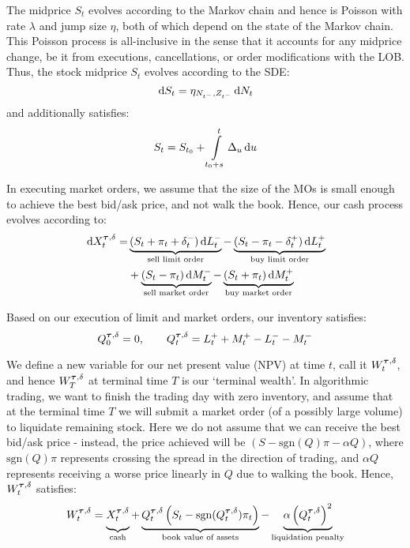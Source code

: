 The midprice $S_t$ evolves according to the Markov chain and hence is Poisson with rate $\lambda$ and jump size $\eta$, both of which depend on the state of the Markov chain. This Poisson process is all-inclusive in the sense that it accounts for any midprice change, be it from executions, cancellations, or order modifications with the LOB. Thus, the stock midprice $S_t$ evolves according to the SDE:
\begin{equation}\label{eq:stockprocess}
\,\mathrm{d} S_t = \eta_{N_{t^-},Z_{t^-}} \,\mathrm{d} N_t
\end{equation}
and additionally satisfies:
\begin{equation}\label{eq:stockintegral} 
S_t = S_{t_0} + \int\limits_{t_0 + s}^t \Delta_u \,\mathrm{d}u
\end{equation}

In executing market orders, we assume that the size of the MOs is small enough to achieve the best bid/ask price, and not walk the book. Hence, our cash process evolves according to:
\begin{equation}\label{eq:cashprocess}
\begin{split}
\,\mathrm{d} X^{\bm{\tau}, \delta}_t = 	&\underbrace{(S_t + \pi_t + \delta^{-}_t) \,\mathrm{d} L^{-}_t}_{\text{sell limit order}} - \underbrace{(S_t - \pi_t - \delta^{+}_t) \,\mathrm{d} L^{+}_t}_{\text{buy limit order}} \\
						&+ \underbrace{(S_t - \pi_t) \,\mathrm{d} M^{-}_t}_{\text{sell market order}} - \underbrace{(S_t + \pi_t) \,\mathrm{d} M^{+}_t}_{\text{buy market order}}
\end{split}
\end{equation}

Based on our execution of limit and market orders, our inventory satisfies:
\begin{equation}\label{eq:inventory}
Q^{\bm{\tau}, \delta}_0 = 0, \qquad Q^{\bm{\tau}, \delta}_t = L^+_t + M^+_t - L^-_t - M^-_t
\end{equation}

We define a new variable for our net present value (NPV) at time $t$, call it $W^{\bm{\tau}, \delta}_t$, and hence $W^{\bm{\tau}, \delta}_T$ at terminal time $T$ is our `terminal wealth'. In algorithmic trading, we want to finish the trading day with zero inventory, and assume that at the terminal time $T$ we will submit a market order (of a possibly large volume) to liquidate remaining stock. Here we do not assume that we can receive the best bid/ask price - instead, the price achieved will be $(S - \mathrm{sgn}(Q)\pi - \alpha Q)$, where $\mathrm{sgn}(Q)\pi$ represents crossing the spread in the direction of trading, and $\alpha Q$ represents receiving a worse price linearly in $Q$ due to walking the book. Hence, $W^{\bm{\tau}, \delta}_t$ satisfies:
\begin{equation}
\label{eq:terminalwealth}
W^{\btau, \delta}_t = \underbrace{\vphantom{\left( Q^{\btau, \delta}_t) \right)}X^{\btau, \delta}_t}_{\text{cash}}+ \underbrace{Q^{\btau, \delta}_t \left( S_t - \mathrm{sgn}(Q^{\btau, \delta}_t)\pi_t \right)}_{\text{book value of assets}} - \underbrace{\alpha \left( Q^{\btau, \delta}_t \right)^2}_{\text{liquidation penalty}}
\end{equation}

